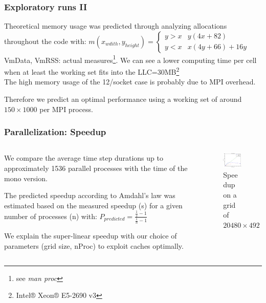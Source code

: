 \documentclass{beamer}
\begin{document}
%
%
%
\begin{frame}
\frametitle{Exploratory runs II}

Theoretical memory usage was predicted through analyzing allocations throughout the code with: $m(x_{wdith},y_{height})=\begin{cases}
y>x & y(4x+82)\\
y<x & x(4y+66)+16y\end{cases}$ \\
VmData, VmRSS: actual measures\footnote{see \emph{man proc}}. We can see a lower computing time per cell when at least the working set fits into the LLC=30MB\footnote{Intel® Xeon® E5-2690 v3}\\ The high memory usage of the 12/socket case is probably due to MPI overhead.
 
Therefore we predict an optimal performance using a working set of around $150\times1000$ per MPI process.

\end{frame}
%
%
%
\begin{frame}
\frametitle{Parallelization: Speedup}
\begin{minipage}[1\textheight]{\textwidth}
\begin{columns}[T]
\begin{column}{0.5\textwidth}
\vspace{5mm}
\justify

We compare the average time step durations up to approximately 1536 parallel processes with the time of the mono version.

The predicted speedup according to Amdahl's law was estimated based on the measured speedup (s) for a given number of processes (n) with: $P_{predicted}=\frac{\frac{1}{s}-1}{\frac{1}{n}-1}$


We explain the super-linear speedup with our choice of parameters (grid size, nProc) to exploit caches optimally.



\end{column}
\begin{column}{0.5\textwidth}
\begin{figure}
\includegraphics[width=6cm]{speedup.pdf}
\caption{Speedup on a grid of $20480\times 492$}

\end{figure}
\end{column}
\end{columns}
\end{minipage}
\end{frame}
\end{document}

